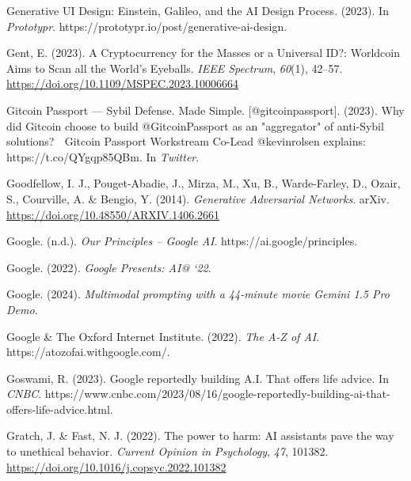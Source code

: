 \documentclass[
  letterpaper,
  DIV=11,
  numbers=noendperiod]{scrartcl}
\newlength{\cslhangindent}
\newenvironment{CSLReferences}[2] %
 {\begin{list}{}{%
  \setlength{\itemindent}{0pt}
  \setlength{\leftmargin}{0pt}
  \setlength{\parsep}{0pt}
  \ifodd #1
   \setlength{\leftmargin}{\cslhangindent}
   \setlength{\itemindent}{-1\cslhangindent}
  \fi
  \setlength{\itemsep}{#2\baselineskip}}}
 {\end{list}}
\begin{document}
\begin{CSLReferences}{1}{0}
Generative {UI Design}: {Einstein}, {Galileo}, and the {AI Design
Process}. (2023). In \emph{Prototypr}.
https://prototypr.io/post/generative-ai-design.

Gent, E. (2023). A {Cryptocurrency} for the {Masses} or a {Universal
ID}?: {Worldcoin Aims} to {Scan} all the {World}'s {Eyeballs}.
\emph{IEEE Spectrum}, \emph{60}(1), 42--57.
\url{https://doi.org/10.1109/MSPEC.2023.10006664}

Gitcoin Passport --- Sybil Defense. Made Simple. {[}@gitcoinpassport{]}.
(2023). Why did {Gitcoin} choose to build @{GitcoinPassport} as an
"aggregator" of anti-{Sybil} solutions? 🤔 {Gitcoin Passport Workstream
Co-Lead} @kevinrolsen explains: {https://t.co/QYgqp85QBm}. In
\emph{Twitter}.

Goodfellow, I. J., Pouget-Abadie, J., Mirza, M., Xu, B., Warde-Farley,
D., Ozair, S., Courville, A. \& Bengio, Y. (2014). \emph{Generative
{Adversarial Networks}}. arXiv.
\url{https://doi.org/10.48550/ARXIV.1406.2661}

Google. (n.d.). \emph{Our {Principles} -- {Google AI}}.
https://ai.google/principles.

Google. (2022). \emph{Google {Presents}: {AI}@ `22}.

Google. (2024). \emph{Multimodal prompting with a 44-minute movie
{\textbar} {Gemini} 1.5 {Pro Demo}}.

Google \& The Oxford Internet Institute. (2022). \emph{The {A-Z} of
{AI}}. https://atozofai.withgoogle.com/.

Goswami, R. (2023). Google reportedly building {A}.{I}. That offers life
advice. In \emph{CNBC}.
https://www.cnbc.com/2023/08/16/google-reportedly-building-ai-that-offers-life-advice.html.

Gratch, J. \& Fast, N. J. (2022). The power to harm: {AI} assistants
pave the way to unethical behavior. \emph{Current Opinion in
Psychology}, \emph{47}, 101382.
\url{https://doi.org/10.1016/j.copsyc.2022.101382}


\end{CSLReferences}
\end{document}
